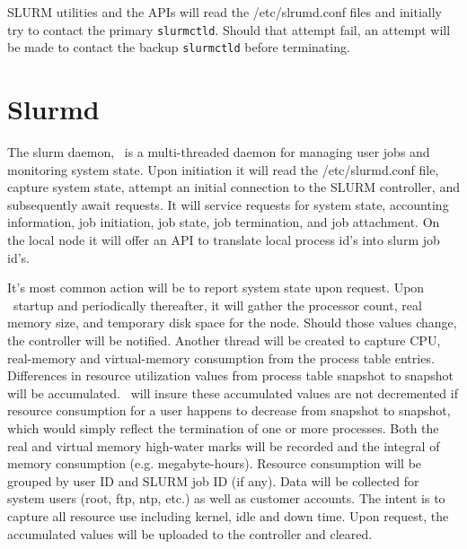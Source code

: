 SLURM utilities and the APIs will read the /etc/slrumd.conf files 
and initially try to contact the primary {\tt slurmctld}. 
Should that attempt fail, an attempt will be made to contact the 
backup {\tt slurmctld} before terminating.

\section{Slurmd}

The slurm daemon, \slurmd\, is a multi-threaded daemon for managing
user jobs and monitoring system state.  Upon initiation it will read
the /etc/slurmd.conf file, capture system state, attempt an initial
connection to the SLURM controller, and subsequently await requests.
It will service requests for system state, accounting information,
job initiation, job state, job termination, and job attachment. On the
local node it will offer an API to translate local process id's into
slurm job id's. 

It's most common action will be to report system state upon request. Upon
\slurmd\ startup and periodically thereafter, it will gather the processor
count, real memory size, and temporary disk space for the node. Should
those values change, the controller will be notified.  Another thread will
be created to capture CPU, real-memory and virtual-memory consumption from
the process table entries.  Differences in resource utilization values
from process table snapshot to snapshot will be accumulated. \slurmd\ 
will insure these accumulated values are not decremented if resource
consumption for a user happens to decrease from snapshot to snapshot,
which would simply reflect the termination of one or more processes.
Both the real and virtual memory high-water marks will be recorded and
the integral of memory consumption (e.g. megabyte-hours).  Resource
consumption will be grouped by user ID and SLURM job ID (if any). Data
will be collected for system users (root, ftp, ntp, etc.) as well as
customer accounts. The intent is to capture all resource use including
kernel, idle and down time.  Upon request, the accumulated values will be
uploaded to the controller and cleared.  


